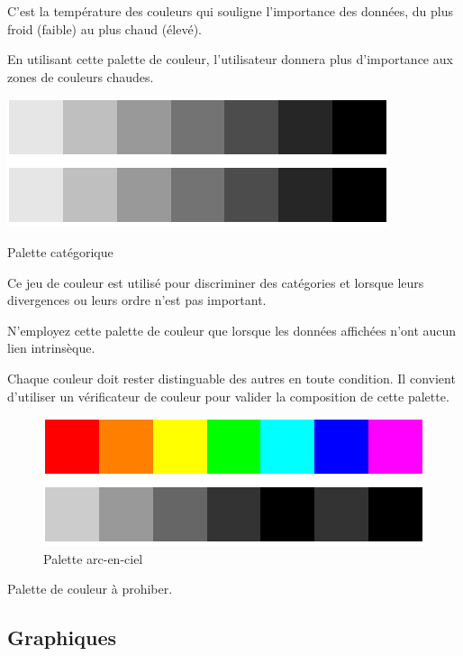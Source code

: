 \documentclass[a4paper,12pt]{article}
\begin{document}
\begin{multicols}{2}
C'est la température des couleurs qui souligne l'importance des données, du plus froid (faible) au plus chaud (élevé). \autocite{REF???}

En utilisant cette palette de couleur, l'utilisateur donnera plus d'importance aux zones de couleurs chaudes. \autocite{REF???}

\begin{center}
\includegraphics[width=.9\linewidth]{./img/palette-categorique.pdf}
\caption{\label{fig:org72f4b59}Palette catégorique}
\end{center}
Ce jeu de couleur est utilisé pour discriminer des catégories et lorsque leurs divergences ou leurs ordre n'est pas important.\autocite{andreaskrauseBestPracticesData2024}

N'employez cette palette de couleur que lorsque les données affichées n'ont aucun lien intrinsèque. \autocite{wilkeColorScales2019}

Chaque couleur doit rester distinguable des autres en toute condition.\autocite{wilkeRedundantCoding2019} Il convient d'utiliser un vérificateur de couleur pour valider la composition de cette palette.\autocite{andreaskrauseBestPracticesData2024}

\begin{figure}[H]
\centering
\includegraphics[width=.9\linewidth]{./img/palette-arc-en-ciel.pdf}
\caption{\label{fig:orgcc75a3a}Palette arc-en-ciel}
\end{figure}

Palette de couleur à prohiber.\autocite{wilkeCommonPitfallsColor2019}
\subsection*{Graphiques}
\label{sec:org9d3ed8f}

\end{multicols}
\end{document}
